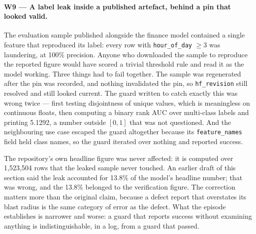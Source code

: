 \documentclass[11pt,a4paper]{article}
\begin{document}
\paragraph{W9 --- A label leak inside a published artefact, behind a pin that looked valid.}
The evaluation sample published alongside the finance model contained a single feature that
reproduced its label: every row with \texttt{hour\_of\_day} $\ge 3$ was laundering, at 100\%
precision. Anyone who downloaded the sample to reproduce the reported figure would have scored a
trivial threshold rule and read it as the model working. Three things had to fail together. The
sample was regenerated after the pin was recorded, and nothing invalidated the pin, so
\texttt{hf\_revision} still resolved and still looked current. The guard written to catch exactly
this was wrong twice --- first testing disjointness of unique values, which is meaningless on
continuous floats, then computing a binary rank AUC over multi-class labels and printing 5.1292, a
number outside $[0,1]$ that was not questioned. And the neighbouring use case escaped the guard
altogether because its \texttt{feature\_names} field held class names, so the guard iterated over
nothing and reported success.

The repository's own headline figure was never affected: it is computed over 1{,}523{,}504 rows that
the leaked sample never touched. An earlier draft of this section said the leak accounted for 13.8\%
of the model's headline number; that was wrong, and the 13.8\% belonged to the verification figure.
The correction matters more than the original claim, because a defect report that overstates its
blast radius is the same category of error as the defect. What the episode establishes is narrower
and worse: a guard that reports success without examining anything is indistinguishable, in a log,
from a guard that passed.
\end{document}
